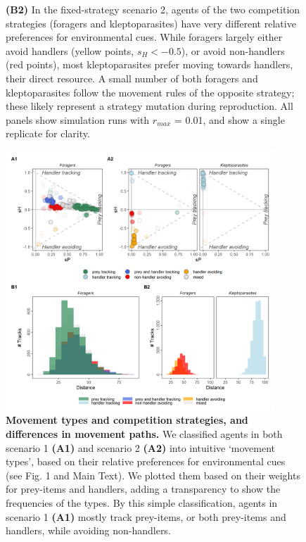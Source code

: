 \begin{figure}[h!]
{            \textbf{(B2)} In the fixed-strategy scenario 2, agents of the two competition strategies (foragers and kleptoparasites) have very different relative preferences for environmental cues.
            While foragers largely either avoid handlers (yellow points, $s_H < -0.5$), or avoid non-handlers (red points), most kleptoparasites prefer moving towards handlers, their direct resource.
            A small number of both foragers and kleptoparasites follow the movement rules of the opposite strategy; these likely represent a strategy mutation during reproduction.
            All panels show simulation runs with $r_{max}$ = 0.01, and show a single replicate for clarity.
        }
        \label{fig1}
    \end{figure}
    
    \begin{figure}[h!]
        \centering
        \includegraphics[width=0.90\textwidth]{figures/patternprocess/fig_02.png}
        \caption{
            \textbf{Movement types and competition strategies, and differences in movement paths.}
            We classified agents in both scenario 1 \textbf{(A1)} and scenario 2 \textbf{(A2)} into intuitive `movement types', based on their relative preferences for environmental cues (see Fig. 1 and Main Text). 
            We plotted them based on their weights for prey-items and handlers, adding a transparency to show the frequencies of the types.
            By this simple classification, agents in scenario 1 \textbf{(A1)} mostly track prey-items, or both prey-items and handlers, while avoiding non-handlers.
}
\end{figure}
